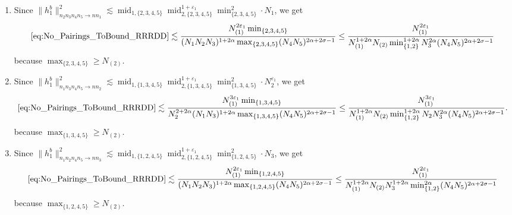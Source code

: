 \documentclass[11pt, xcolor = dvipsnames,reqno
]{amsart}
\theoremstyle{definition}
\theoremstyle{remark}
\begin{document}
\begin{itemize}
\begin{enumerate}
    \item Since $\lVert h^b_1 \rVert_{n_2n_3n_4n_5 \to nn_1}^2  \lesssim 
    \operatorname{mid}_{1,\{2,3,4,5\}} \operatorname{mid}_{2,\{2,3,4,5\}}^{1+\varepsilon_1} \operatorname{min}_{\{2,3,4,5\}}^2
    \cdot N_1$, we get 
    \begin{align}
        \eqref{eq:No_Pairings_ToBound_RRRDD} 
        \lesssim  
        \frac{N_{(1)}^{2\varepsilon_1} \operatorname{min}_{\{2,3,4,5\}} }{(N_1 N_2 N_3)^{1+2\alpha} \operatorname{max}_{\{2,3,4,5\}}(N_4N_5)^{2\alpha + 2\sigma - 1}}
        \leq 
        \frac{N_{(1)}^{2\varepsilon_1} }{N_{(1)}^{1+2\alpha} N_{(2)} \min_{\{1,2\}}^{1+2\alpha} N_3^{2\alpha} (N_4N_5)^{2\alpha + 2\sigma - 1}}
    \end{align}
    because $\operatorname{max}_{\{2,3,4,5\}} \geq N_{(2)}$.

    \item  Since $\lVert h^b_1 \rVert_{n_1n_3n_4n_5 \to nn_2}^2 \lesssim 
    \operatorname{mid}_{1,\{1,3,4,5\}} \operatorname{mid}_{2,\{1,3,4,5\}}^{1+\varepsilon_1} \operatorname{min}_{\{1,3,4,5\}}^2
    \cdot N_2^{\varepsilon_1}$, we get 
    \begin{align}
        \eqref{eq:No_Pairings_ToBound_RRRDD}
        \lesssim 
        \frac{N_{(1)}^{3\varepsilon_1} \operatorname{min}_{\{1,3,4,5\}}}{ N_2^{2 + 2\alpha} (N_1N_3)^{1 + 2\alpha} \operatorname{max}_{\{1,3,4,5\}} (N_4N_5)^{2\alpha + 2\sigma - 1 }}
        \leq 
        \frac{N_{(1)}^{3\varepsilon_1}}{ N_{(1)}^{1+2\alpha} N_{(2)} \min_{\{1,2\}}^{1+2\alpha} N_2 N_3^{2\alpha} (N_4N_5)^{2\alpha + 2\sigma - 1}}.
    \end{align}
    because $\operatorname{max}_{\{1,3,4,5\}} \geq N_{(2)}$.
    
    \item Since $\lVert h^b_1 \rVert_{n_1n_2n_4n_5 \to nn_3}^2 \lesssim 
    \operatorname{mid}_{1,\{1,2,4,5\}} \operatorname{mid}_{2,\{1,2,4,5\}}^{1+\varepsilon_1} \operatorname{min}_{\{1,2,4,5\}}^2
    \cdot N_3$, we get 
    \begin{align}
        \eqref{eq:No_Pairings_ToBound_RRRDD}
        \lesssim 
        \frac{ N_{(1)}^{2\varepsilon_1} \operatorname{min}_{\{1,2,4,5\}} }{(N_1N_2N_3)^{1 + 2\alpha} \operatorname{max}_{\{1,2,4,5\}}(N_4N_5)^{2\alpha + 2\sigma - 1}}
        \leq 
        \frac{ N_{(1)}^{2\varepsilon_1} }{N_{(1)}^{1+2\alpha} N_{(2)}  N_3^{1 + 2\alpha} \min_{\{1,2\}}^{2\alpha}(N_4N_5)^{2\alpha + 2\sigma - 1 }}
    \end{align}
    because $\operatorname{max}_{\{1,2,4,5\}} \geq N_{(2)}$.



\end{enumerate}
\end{itemize}
\end{document}
